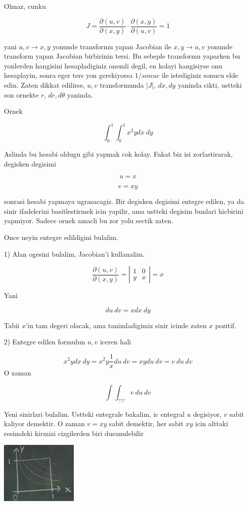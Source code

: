 \documentclass[12pt,fleqn]{article}\usepackage{../common}
\begin{document}
Olmaz, cunku 

\[ J = \frac{\partial (u,v)}{\partial(x,y)} \cdot
\frac{\partial (x,y)}{\partial(u,v)} = 1
 \]

yani $u,v \to x,y$ yonunde transformu yapan Jacobian ile $x,y \to u,v$
yonunde transform yapan Jacobian birbirinin tersi. Bu sebeple transformu
yaparken bu yonlerden hangisini hesapladiginiz onemli degil, en kolayi
hangisiyse onu hesaplayin, sonra eger ters yon gerekiyorsa $1 / sonuc$ ile
istediginiz sonucu elde edin. Zaten dikkat edilirse, $u,v$ transformunda
$|J|$, $dx,dy$ yaninda cikti, ustteki son ornekte $r$, $dr,d\theta$
yaninda. 

Ornek

\[ \int_0^1 \int_0^1 x^2y dx \ dy  \]

Aslinda bu hesabi oldugu gibi yapmak cok kolay. Fakat biz isi
zorlastirarak, degisken degisimi

\[ u =x  \]

\[ v = xy \]

sonrasi hesabi yapmaya ugrasacagiz. Bir degisken degisimi entegre edilen,
ya da sinir ifadelerini basitlestirmek icin yapilir, ama ustteki degisim
bunlari hicbirini yapmiyor. Sadece ornek amacli bu zor yolu sectik zaten. 

Once neyin entegre edildigini bulalim. 

1) Alan ogesini bulalim, Jacobian'i kullanalim. 

\[ \frac{\partial (u,v)}{\partial(x,y)}  = 
\left|\begin{array}{rr}
1 & 0 \\
y & x
\end{array}\right| = 
x
 \]

Yani

\[ du \ dv = x dx \ dy \]

Tabii $x$'in tam degeri olacak, ama tanimladigimiz sinir icinde zaten $x$
pozitif. 

2) Entegre edilen formulun $u,v$ iceren hali 

\[ x^2y dx \ dy =  x^2y  \frac{1}{x} du \ dv = 
xy du \ dv = 
v \ du \ dv 
\]
O zaman 

\[ \int \int _{???} v \ du \ dv \]

Yeni sinirlari bulalim. Ustteki entegrale bakalim, ic entegral $u$
degisiyor, $v$ sabit kaliyor demektir. O zaman $v=xy$ sabit demektir, her
sabit $xy$ icin alttaki resimdeki kirmizi cizgilerden biri dusunulebilir

\includegraphics[height=3cm]{18_6.png}
\end{document}
